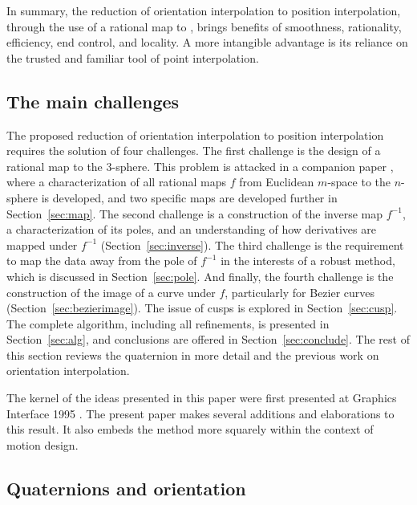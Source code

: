 \documentclass[12pt]{article}
\begin{document}
In summary, the reduction of orientation interpolation to position interpolation,
through the use of a rational map to ,
brings benefits of smoothness, rationality, efficiency, end control, and locality.
A more intangible advantage is its reliance on the trusted and familiar tool
of point interpolation.

\subsection{The main challenges}

The proposed reduction of orientation interpolation to position interpolation
requires the solution of four challenges.
The first challenge is the design of a rational map to the 3-sphere.
This problem is attacked in a companion paper \cite{jjrm05},
where a characterization of all rational maps $f$ from Euclidean $m$-space 
to the $n$-sphere is developed,
and two specific maps are developed further in Section~\ref{sec:map}.
The second challenge is a construction of the inverse map $f^{-1}$,
a characterization of its poles, and an understanding of how derivatives
are mapped under $f^{-1}$ (Section~\ref{sec:inverse}).
The third challenge is the requirement to map the data away from the pole of $f^{-1}$
in the interests of a robust method, which is discussed in Section~\ref{sec:pole}.
And finally, the fourth challenge is the construction of the image of a curve under $f$,
particularly for Bezier curves (Section~\ref{sec:bezierimage}).
The issue of cusps is explored in Section~\ref{sec:cusp}.
The complete algorithm, including all refinements, is presented in Section~\ref{sec:alg},
and conclusions are offered in Section~\ref{sec:conclude}.
The rest of this section reviews the quaternion in more detail 
and the previous work on orientation interpolation.

The kernel of the ideas presented in this paper were first presented 
at Graphics Interface 1995 \cite{jjjimbo95}.
The present paper makes several additions and elaborations to this result.
It also embeds the method more squarely within the context of motion design.

\subsection{Quaternions and orientation}
\label{sec:quaternionTheory}
\end{document}
